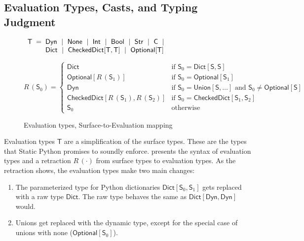\documentclass[english,cleveref,crc]{programming}
\makeatletter
\newcommand{\SP}{Static Python}
\newcommand{\defeq}{=}
\newcommand{\mfeq}{=}
\newcommand{\langmid}{~\mid~} %
\newenvironment{langarray}{\(\begin{array}{l@{\hspace{2mm}}c@{\hspace{2mm}}l}}{\end{array}\)}
\newcommand{\typefont}[1]{\mathsf{#1}}
\newcommand{\paramtype}[2]{#1[#2]}
\newcommand{\sptype}{\typefont{S}}
\newcommand{\spteval}{\typefont{T}}
\newcommand{\sptclass}{\typefont{C}}
\newcommand{\sptint}{\typefont{Int}}
\newcommand{\sptstr}{\typefont{Str}}
\newcommand{\sptbool}{\typefont{Bool}}
\newcommand{\sptdyn}{\typefont{Dyn}}
\newcommand{\sptnone}{\typefont{None}}
\newcommand{\sptoptional}[1]{\paramtype{\typefont{Optional}}{#1}}
\newcommand{\sptunion}[1]{\paramtype{\typefont{Union}}{#1}}
\newcommand{\sptrawpydict}{\typefont{Dict}}
\newcommand{\sptrawchkdict}{\typefont{CheckedDict}} %
\newcommand{\sptpydict}[2]{\paramtype{\sptrawpydict}{#1, #2}}
\newcommand{\sptchkdict}[2]{\paramtype{\sptrawchkdict}{#1, #2}}
\newcommand{\mfapply}[2]{#1\,(#2)}
\newcommand{\mffont}[1]{\mathit{#1}}
\newcommand{\mftypeF}[1]{\mfapply{\mffont{R}}{#1}} %
\makeatother
\begin{document}
\subsection{Evaluation Types, Casts, and Typing Judgment}
\label{s:eval-types}

\begin{figure}[t]
  \begin{langarray}
    \spteval & \defeq &
      \sptdyn \langmid
      \sptnone \langmid
      \sptint \langmid
      \sptbool \langmid
      \sptstr \langmid
      \sptclass \langmid
    \\ & &
      \sptrawpydict \langmid
      \sptchkdict{\spteval}{\spteval} \langmid
      \sptoptional{\spteval}
  \end{langarray}

  \bigskip
  \(
    \mftypeF{\sptype_0}
    \mfeq
    \left\{\begin{array}{ll}
      \sptrawpydict & \mbox{if $\sptype_0 = \sptpydict{\sptype}{\sptype}$}
    \\
      \sptoptional{\mftypeF{\sptype_1}} & \mbox{if $\sptype_0 = \sptoptional{\sptype_1}$}
    \\
      \sptdyn & \mbox{if $\sptype_0 = \sptunion{\sptype, \ldots}$ and $\sptype_0 \neq \sptoptional{\sptype}\!\!\!\!$}
    \\
      \sptchkdict{\mftypeF{\sptype_1}}{\mftypeF{\sptype_2}} & \mbox{if $\sptype_0 = \sptchkdict{\sptype_1}{\sptype_2}$}
    \\
      \sptype_0 & \mbox{otherwise}
    \end{array}\right.
  \)

  \caption{Evaluation types, Surface-to-Evaluation mapping}
  \label{f:surface-to-eval-types}
\end{figure}

Evaluation types $\spteval$ are a simplification of the surface types.
These are the types that \SP{} promises to soundly enforce.
 presents the syntax of evaluation types
and a retraction $\mftypeF{\cdot}$ from surface types to evaluation types.
As the retraction shows, the evaluation types make two main changes:
\begin{enumerate}
  \item
    The parameterized type for Python dictionaries
    $\sptpydict{\sptype_0}{\sptype_1}$ gets replaced with
    a raw type $\sptrawpydict$.
    The raw type behaves the same as $\sptpydict{\sptdyn}{\sptdyn}$ would.
  \item
    Unions get replaced with the dynamic type, except for the special case
    of unions with none ($\sptoptional{\sptype_0}$).
\end{enumerate}
\end{document}
